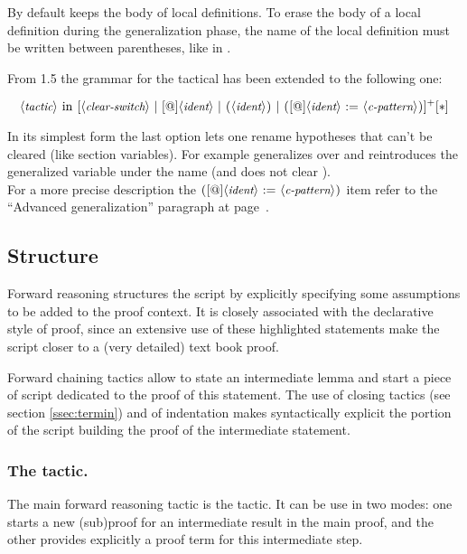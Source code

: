 By default  keeps the body of local definitions. To erase
the body of a local definition during the generalization phase,
the name of the local definition must be written between parentheses,
like in .

From \ssr{} 1.5 the grammar for the  tactical has been extended
to the following one:

$$\N{tactic}\ \C{in}\ [ \N{clear-switch}\ |\
                        [\C{@}]\N{ident}\ |\
                        \C{(}\N{ident}\C{)}\ |\
                        \C{(}[\C{@}]\N{ident}\ \C{:=}\ \N{c-pattern}\C{)}
                      ]^+ [\C{*}]$$

In its simplest form the last option lets one rename hypotheses that can't be
cleared (like section variables).  For example  generalizes
over  and reintroduces the generalized
variable under the name \C{y} (and does not clear \C{x}).\\
For a more precise description the $\C{(}[\C{@}]\N{ident}\ \C{:=}\ \N{c-pattern}\C{)}$
item refer to the ``Advanced generalization'' paragraph at page~\pageref{par:advancedgen}.

\subsection{Structure}\label{ssec:struct}

Forward reasoning structures the script by explicitly specifying some
assumptions to be added to the proof context. It is closely associated
with the declarative style of proof, since an extensive use of these
highlighted statements
make the script closer to a (very detailed) text book proof.

Forward chaining tactics allow to state an intermediate lemma and start a
piece of script dedicated to the proof of this statement. The use of
closing tactics (see section \ref{ssec:termin}) and of
indentation makes syntactically explicit the portion of the script
building the proof of the intermediate statement.

\subsubsection*{The \C{have} tactic.}
\label{sssec:have}

The main \ssr{} forward reasoning tactic is the  tactic. It
can be use in two modes: one starts a new (sub)proof for an
intermediate result in the main proof, and the other
provides explicitly a proof term for this intermediate step.

